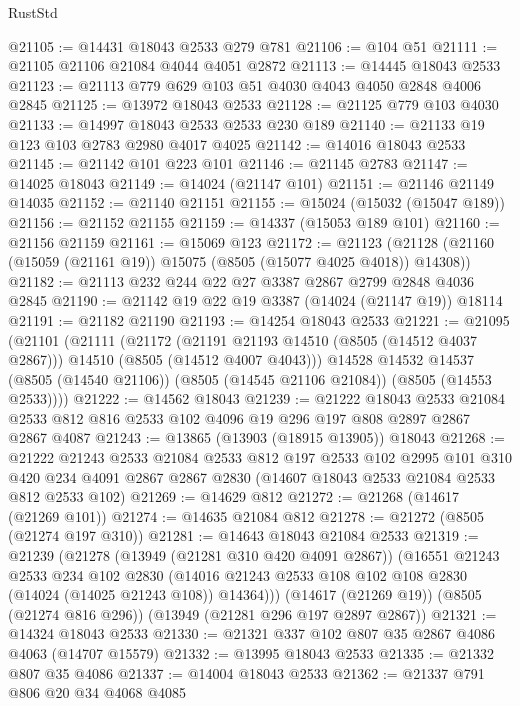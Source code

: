 \begin{lexlean}{RustStd}
\begin{coremodule}
@21105 := @14431 @18043 @2533 @279 @781
@21106 := @104 @51
@21111 := @21105 @21106 @21084 @4044 @4051 @2872
@21113 := @14445 @18043 @2533
@21123 := @21113 @779 @629 @103 @51 @4030 @4043 @4050 @2848 @4006 @2845
@21125 := @13972 @18043 @2533
@21128 := @21125 @779 @103 @4030
@21133 := @14997 @18043 @2533 @2533 @230 @189
@21140 := @21133 @19 @123 @103 @2783 @2980 @4017 @4025
@21142 := @14016 @18043 @2533
@21145 := @21142 @101 @223 @101
@21146 := @21145 @2783
@21147 := @14025 @18043
@21149 := @14024 (@21147 @101)
@21151 := @21146 @21149 @14035
@21152 := @21140 @21151
@21155 := @15024 (@15032 (@15047 @189))
@21156 := @21152 @21155
@21159 := @14337 (@15053 @189 @101)
@21160 := @21156 @21159
@21161 := @15069 @123
@21172 := @21123 (@21128 (@21160 (@15059 (@21161 @19)) @15075 (@8505 (@15077 @4025 @4018)) @14308))
@21182 := @21113 @232 @244 @22 @27 @3387 @2867 @2799 @2848 @4036 @2845
@21190 := @21142 @19 @22 @19 @3387 (@14024 (@21147 @19)) @18114
@21191 := @21182 @21190
@21193 := @14254 @18043 @2533
@21221 := @21095
    (@21101
      (@21111
        (@21172
          (@21191 @21193 @14510 (@8505 (@14512 @4037 @2867)))
          @14510
          (@8505 (@14512 @4007 @4043)))
        @14528
        @14532
        @14537
        (@8505 (@14540 @21106))
        (@8505 (@14545 @21106 @21084))
        (@8505 (@14553 @2533))))
@21222 := @14562 @18043
@21239 := @21222
    @18043
    @2533
    @21084
    @2533
    @812
    @816
    @2533
    @102
    @4096
    @19
    @296
    @197
    @808
    @2897
    @2867
    @2867
    @4087
@21243 := @13865 (@13903 (@18915 @13905)) @18043
@21268 := @21222
    @21243
    @2533
    @21084
    @2533
    @812
    @197
    @2533
    @102
    @2995
    @101
    @310
    @420
    @234
    @4091
    @2867
    @2867
    @2830
    (@14607 @18043 @2533 @21084 @2533 @812 @2533 @102)
@21269 := @14629 @812
@21272 := @21268 (@14617 (@21269 @101))
@21274 := @14635 @21084 @812
@21278 := @21272 (@8505 (@21274 @197 @310))
@21281 := @14643 @18043 @21084 @2533
@21319 := @21239
    (@21278
      (@13949 (@21281 @310 @420 @4091 @2867))
      (@16551
        @21243
        @2533
        @234
        @102
        @2830
        (@14016 @21243 @2533 @108 @102 @108 @2830 (@14024 (@14025 @21243 @108)) @14364)))
    (@14617 (@21269 @19))
    (@8505 (@21274 @816 @296))
    (@13949 (@21281 @296 @197 @2897 @2867))
@21321 := @14324 @18043 @2533
@21330 := @21321 @337 @102 @807 @35 @2867 @4086 @4063 (@14707 @15579)
@21332 := @13995 @18043 @2533
@21335 := @21332 @807 @35 @4086
@21337 := @14004 @18043 @2533
@21362 := @21337
    @791
    @806
    @20
    @34
    @4068
    @4085

\end{coremodule}
\end{lexlean}
